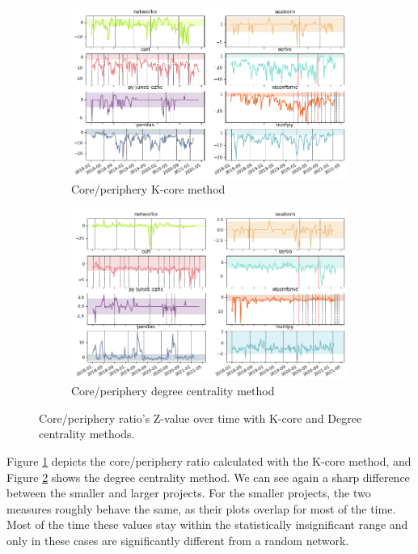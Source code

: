 \begin{figure}
    \centering
    \begin{subfigure}{0.99\textwidth}
        \centering
        \includegraphics[width=0.99\textwidth]{figures/qualitative/core_periphery/core_periphery_k_core.png}
        \caption{Core/periphery K-core method}
        \label{fig:cp-k-core}
    \end{subfigure}
    \begin{subfigure}{0.99\textwidth}
        \centering
        \includegraphics[width=0.99\textwidth]{figures/qualitative/core_periphery/core_periphery_degree.png}
        \caption{Core/periphery degree centrality method}
        \label{fig:cp-degree-centrality}
    \end{subfigure}
    \caption{Core/periphery ratio's Z-value over time with K-core and Degree centrality methods.}
    \label{fig:core-periphery}

\end{figure}

Figure \ref{fig:cp-k-core} depicts the core/periphery ratio calculated with the K-core method, and Figure \ref{fig:cp-degree-centrality} shows the degree centrality method. We can see again a sharp difference between the smaller and larger projects. For the smaller projects, the two measures roughly behave the same, as their plots overlap for most of the time. Most of the time these values stay within the statistically insignificant range and only in these cases are significantly different from a random network.

